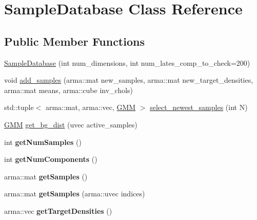 \hypertarget{classSampleDatabase}{}\section{Sample\+Database Class Reference}
\label{classSampleDatabase}
\subsection*{Public Member Functions}
\begin{DoxyCompactItemize}
\item 
\hyperlink{classSampleDatabase_a92a9faa8a5c447708c1c4dda6ea2323a}{Sample\+Database} (int num\+\_\+dimensions, int num\+\_\+lates\+\_\+comp\+\_\+to\+\_\+check=200)
\item 
void \hyperlink{classSampleDatabase_a3dc15b26c93e6f426ed0da35819c8480}{add\+\_\+samples} (arma\+::mat new\+\_\+samples, arma\+::mat new\+\_\+target\+\_\+densities, arma\+::mat means, arma\+::cube inv\+\_\+chols)
\item 
std\+::tuple$<$ arma\+::mat, arma\+::vec, \hyperlink{classGMM}{G\+MM} $>$ \hyperlink{classSampleDatabase_aa1784badb57e66125725f2701d513382}{select\+\_\+newest\+\_\+samples} (int N)
\item 
\hyperlink{classGMM}{G\+MM} \hyperlink{classSampleDatabase_ab997776649b126365e25335782c1fa44}{get\+\_\+bg\+\_\+dist} (uvec active\+\_\+samples)
\item 
int {\bfseries get\+Num\+Samples} ()\hypertarget{classSampleDatabase_acc174c6265412a0fa14fc70e99ac5826}{}\label{classSampleDatabase_acc174c6265412a0fa14fc70e99ac5826}

\item 
int {\bfseries get\+Num\+Components} ()\hypertarget{classSampleDatabase_ac60d156aee4f7c99a05db259b2a7247f}{}\label{classSampleDatabase_ac60d156aee4f7c99a05db259b2a7247f}

\item 
arma\+::mat {\bfseries get\+Samples} ()\hypertarget{classSampleDatabase_a4aabc7d8ad5d3907b5eda51bc6612a4a}{}\label{classSampleDatabase_a4aabc7d8ad5d3907b5eda51bc6612a4a}

\item 
arma\+::mat {\bfseries get\+Samples} (arma\+::uvec indices)\hypertarget{classSampleDatabase_ab3e52f865350a6d88b16b089b61c3dd9}{}\label{classSampleDatabase_ab3e52f865350a6d88b16b089b61c3dd9}

\item 
arma\+::vec {\bfseries get\+Target\+Densities} ()\hypertarget{classSampleDatabase_a17fe9d9d904446ed71b717166ab452f3}{}\label{classSampleDatabase_a17fe9d9d904446ed71b717166ab452f3}


\end{DoxyCompactItemize}
